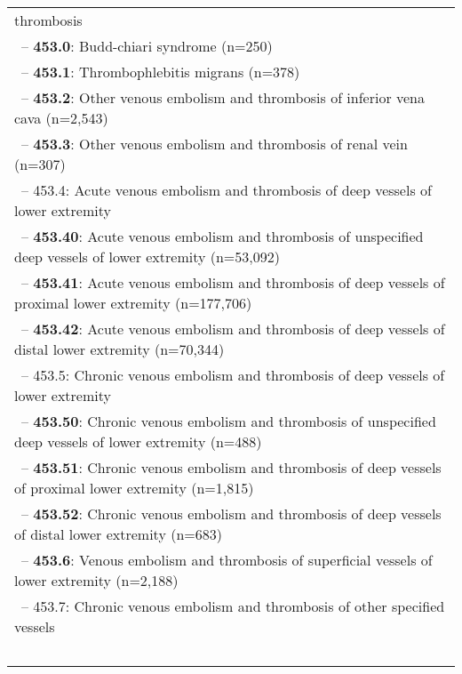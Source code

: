 \begin{longtable}{p{\textwidth}}
thrombosis} \\ \-\ \hspace{30pt}\footnotesize{-- {\color{ForestGreen} \textbf{453.0}}: Budd-chiari syndrome (n=250)} \\ \-\ \hspace{30pt}\footnotesize{-- {\color{ForestGreen} \textbf{453.1}}: Thrombophlebitis migrans (n=378)} \\ \-\ \hspace{30pt}\footnotesize{-- {\color{ForestGreen} \textbf{453.2}}: Other venous embolism and thrombosis of inferior vena cava (n=2,543)} \\ \-\ \hspace{30pt}\footnotesize{-- {\color{ForestGreen} \textbf{453.3}}: Other venous embolism and thrombosis of renal vein (n=307)} \\ \-\ \hspace{30pt}\footnotesize{-- 453.4: Acute venous embolism and thrombosis of deep vessels of lower extremity} \\ \-\ \hspace{40pt}\footnotesize{-- {\color{ForestGreen} \textbf{453.40}}: Acute venous embolism and thrombosis of unspecified deep vessels of lower extremity (n=53,092)} \\ \-\ \hspace{40pt}\footnotesize{-- {\color{ForestGreen} \textbf{453.41}}: Acute venous embolism and thrombosis of deep vessels of proximal lower extremity (n=177,706)} \\ \-\ \hspace{40pt}\footnotesize{-- {\color{ForestGreen} \textbf{453.42}}: Acute venous embolism and thrombosis of deep vessels of distal lower extremity (n=70,344)} \\ \-\ \hspace{30pt}\footnotesize{-- 453.5: Chronic venous embolism and thrombosis of deep vessels of lower extremity} \\ \-\ \hspace{40pt}\footnotesize{-- {\color{ForestGreen} \textbf{453.50}}: Chronic venous embolism and thrombosis of unspecified deep vessels of lower extremity (n=488)} \\ \-\ \hspace{40pt}\footnotesize{-- {\color{ForestGreen} \textbf{453.51}}: Chronic venous embolism and thrombosis of deep vessels of proximal lower extremity (n=1,815)} \\ \-\ \hspace{40pt}\footnotesize{-- {\color{ForestGreen} \textbf{453.52}}: Chronic venous embolism and thrombosis of deep vessels of distal lower extremity (n=683)} \\ \-\ \hspace{30pt}\footnotesize{-- {\color{ForestGreen} \textbf{453.6}}: Venous embolism and thrombosis of superficial vessels of lower extremity (n=2,188)} \\ \-\ \hspace{30pt}\footnotesize{-- 453.7: Chronic venous embolism and thrombosis of other specified vessels} \\ \-\ \hspace{40pt}\footnotesize{-- {\color{ForestGreen} 
\end{longtable}
